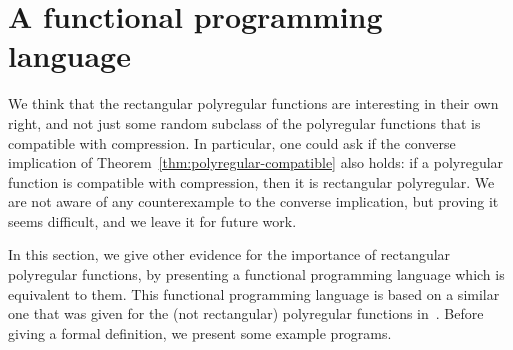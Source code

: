
\newcommand{\reverseterm}{\mathtt{reverse}}
\newcommand{\leftterm}{\mathtt{Left}}
\newcommand{\rightterm}{\mathtt{Right}}
\newcommand{\fstterm}{\mathtt{fst}}
\newcommand{\sndterm}{\mathtt{snd}}
\newcommand{\mapterm}{\mathtt{map}}
\newcommand{\casesterm}{\mathtt{either}}
\newcommand{\splitterm}{\mathtt{split}}
\newcommand{\multterm}{\mathtt{mult}}
\newcommand{\headtailterm}{\mathtt{headtail}}
\newcommand{\concatterm}{\mathtt{concat}}
\newcommand{\headterm}{\mathtt{head}}
\newcommand{\tailterm}{\mathtt{tail}}
\newcommand{\blockterm}{\mathtt{block}}
\newcommand{\typecolor}[1]{{\color{cyan}#1}}
\newcommand{\church}[2]{#1^{\typecolor{#2}}}
\newcommand{\height}{\mathtt{height}}

\section{A functional programming language}
\label{sec:functional-lang}
We think that the rectangular polyregular functions are interesting in their own right, and not just some random subclass of the polyregular functions that  is compatible with compression. In particular, one could ask if the converse implication of Theorem~\ref{thm:polyregular-compatible} also holds: if a polyregular function is compatible with compression, then it is rectangular polyregular. We are not aware of any counterexample to the converse implication, but proving it   seems difficult, and we leave it for future work.  


In this section, we give other evidence for the importance of rectangular polyregular functions, by presenting a  functional programming language which is equivalent to them. This functional programming language is based on a similar one that was given for the (not rectangular) polyregular functions in~\cite[Section 4.1]{polyregular-survey}. Before giving a formal definition, we present some example programs.



